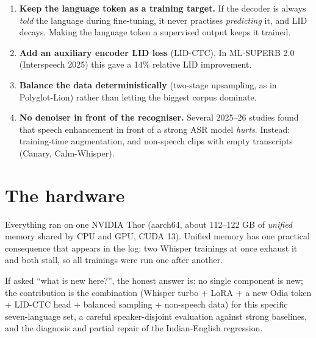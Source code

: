 \begin{intuition}
\begin{enumerate}
\item \textbf{Keep the language token as a training target.} If the decoder is always \emph{told} the language during fine-tuning,
it never practises \emph{predicting} it, and LID decays. Making the language token a supervised output keeps it trained.
\item \textbf{Add an auxiliary encoder LID loss} (LID-CTC). In ML-SUPERB 2.0 (Interspeech 2025) this gave a 14\% relative LID
improvement.
\item \textbf{Balance the data deterministically} (two-stage upsampling, as in Polyglot-Lion) rather than letting the biggest corpus
dominate.
\item \textbf{No denoiser in front of the recogniser.} Several 2025--26 studies found that speech enhancement in front of a strong
ASR model \emph{hurts}. Instead: training-time augmentation, and non-speech clips with empty transcripts (Canary, Calm-Whisper).
\end{enumerate}
\end{intuition}

\section{The hardware}
Everything ran on one NVIDIA Thor (aarch64, about 112--122 GB of \emph{unified} memory shared by CPU and GPU, CUDA 13). Unified
memory has one practical consequence that appears in the log: two Whisper trainings at once exhaust it and both stall, so all
trainings were run one after another.

\begin{vivatip}
If asked ``what is new here?'', the honest answer is: no single component is new; the contribution is the combination (Whisper
turbo + LoRA + a new Odia token + LID-CTC head + balanced sampling + non-speech data) for this specific seven-language set, a careful
speaker-disjoint evaluation against strong baselines, and the diagnosis and partial repair of the Indian-English regression.
\end{vivatip}

